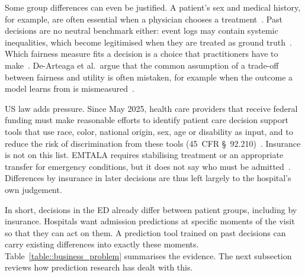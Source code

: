 Some group differences can even be justified. A patient's sex and medical history, for example, are often essential when a physician chooses a treatment~\cite{lepsien2026role}. Past decisions are no neutral benchmark either: event logs may contain systemic inequalities, which become legitimised when they are treated as ground truth~\cite{revoredo2026towards}. Which fairness measure fits a decision is a choice that practitioners have to make~\cite{feuerriegel2020fair}. De-Arteaga et al.\ argue that the common assumption of a trade-off between fairness and utility is often mistaken, for example when the outcome a model learns from is mismeasured~\cite{dearteaga2022algorithmic}.

US law adds pressure. Since May 2025, health care providers that receive federal funding must make reasonable efforts to identify patient care decision support tools that use race, color, national origin, sex, age or disability as input, and to reduce the risk of discrimination from these tools (45~CFR \S~92.210)~\cite{hhs2024nondiscrimination,lacava2026future}. Insurance is not on this list. EMTALA requires stabilising treatment or an appropriate transfer for emergency conditions, but it does not say who must be admitted~\cite{emtala}. Differences by insurance in later decisions are thus left largely to the hospital's own judgement.

In short, decisions in the ED already differ between patient groups, including by insurance. Hospitals want admission predictions at specific moments of the visit so that they can act on them. A prediction tool trained on past decisions can carry existing differences into exactly these moments. Table~\ref{table::business_problem} summarises the evidence. The next subsection reviews how prediction research has dealt with this.


